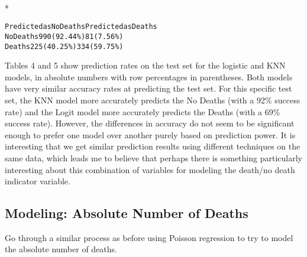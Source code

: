 \documentclass[letterpaper,10pt,english]{/usr/share/sphinx/texinputs/sphinxhowto}
\def\smaller{\fontsize{9.5pt}{9.5pt}\selectfont}
\newenvironment{InvisibleVerbatim}
        {\begin{mdframed}[leftmargin=0.1\linewidth,innerleftmargin=3pt,innerrightmargin=3pt, userdefinedwidth=1\linewidth, linewidth=0pt, linecolor=white, usetwoside=false]}
        {\end{mdframed}}
\begin{document}
                \makebox[0.1\linewidth]{\smaller\hfill\tt\color{nbframe-out-prompt}Out\hspace{4pt}{[}49{]}:\hspace{4pt}}\\*
                \vspace{-2.55\baselineskip}\begin{InvisibleVerbatim}
                \vspace{-0.5\baselineskip}
\begin{alltt}          Predicted as No Deaths Predicted as Deaths
No Deaths           990 (92.44\%)          81 (7.56\%)
Deaths              225 (40.25\%)        334 (59.75\%)\end{alltt}

            \end{InvisibleVerbatim}
            
        
    
Tables 4 and 5 show prediction rates on the test set for the logistic
and KNN models, in absolute numbers with row percentages in parentheses.
Both models have very similar accuracy rates at predicting the test set.
For this specific test set, the KNN model more accurately predicts the
No Deaths (with a 92\% success rate) and the Logit model more accurately
predicts the Deaths (with a 69\% success rate). However, the differences
in accuracy do not seem to be significant enough to prefer one model
over another purely based on prediction power. It is interesting that we
get similar prediction results using different techniques on the same
data, which leads me to believe that perhaps there is something
particularly interesting about this combination of variables for
modeling the death/no death indicator variable.\subsection{Modeling: Absolute Number of Deaths}Go through a similar process as before using Poisson regression to try
to model the absolute number of deaths.

\end{document}
